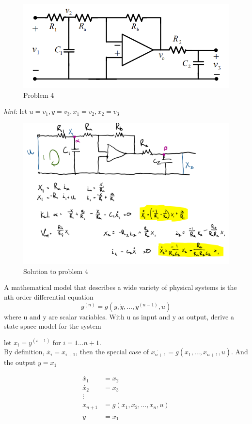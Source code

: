 \documentclass[11pt]{article}
\begin{document}
\begin{figure}[h] 
    \centering
    \includegraphics[width=0.55 \linewidth]{p4}
    \caption{Problem 4}
    \label{fig:p4}
\end{figure}

\textit{hint}: let $u = v_1, y = v_3, x_1 = v_2, x_2 = v_3$

\soln

\begin{figure}[h] 
    \centering
    \includegraphics[width=0.65 \linewidth]{p4_soln}
    \caption{Solution to problem 4}
    \label{fig:}
\end{figure}


A mathematical model that describes a wide variety of physical systems is
the nth order differential equation
$$
y^{(n)} = g(y, \dot{y}, \dots, y^{(n-1)}, u)
$$
where u and y are scalar variables. With u as input and y as output, derive a state space
model for the system

\soln

let $x_i = y^{(i - 1)}$ for $i = 1 \dots n+1$. \\
By definition, $\dot{x_i} = x_{i+1}$, then the special case of $\dot{x_{n+1}} = g(x_1, \dots, x_{n+1}, u)$.
And the output $y = x_1$

\begin{align*}
    \dot{x_1} &= x_2 \\
    \dot{x_2} &= x_3 \\
    \vdots \\
    \dot{x_{n+1}} &= g(x_1, x_2, \dots, x_{n}, u) \\
    \\
    y &= x_1
\end{align*}
\end{document}
